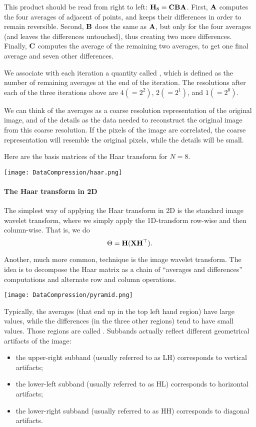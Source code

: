 \documentclass[a4paper, 11pt, openany]{book}
\begin{document}
This product should be read from right to left: ${\bf H}_8 = {\bf C}{\bf B}{\bf A}$. First, ${\bf A}$ computes the four averages of adjacent of points, and keeps their differences in order to remain reversible. Second, ${\bf B}$ does the same as ${\bf A}$, but only for the four averages (and leaves the differences untouched), thus creating two more differences. Finally, ${\bf C}$ computes the average of the remaining two averages, to get one final average and seven other differences.

We associate with each iteration a quantity called , which is defined as the number of remaining averages at the end of the iteration. The resolutions after each of the three iterations above are $4(= 2^2)$, $2(= 2^1)$, and $1(= 2^0)$.

We can think of the averages as a coarse resolution representation of
the original image, and of the details as the data needed to reconstruct the original image from this coarse resolution. If the pixels of the image are correlated, the coarse representation will resemble the original pixels, while the details will be small.

Here are the basis matrices of the Haar transform for $N = 8$.

\begin{center}
\texttt{[image: DataCompression/haar.png]}
\end{center}

\paragraph{The Haar transform in 2D}
The simplest way of applying the Haar transform in 2D is the standard image wavelet transform, where we simply apply the 1D-transform row-wise and then column-wise. That is, we do
\[
    \Theta = {\bf H} ({\bf X}{\bf H}^\top).
\]

Another, much more common, technique is the  image wavelet transform. The idea is to decompose the Haar matrix as a chain of ``averages and differences'' computations and alternate row and column operations.

\begin{center}
\texttt{[image: DataCompression/pyramid.png]}
\end{center}


Typically, the averages (that end up in the top left hand region) have large values, while the differences (in the three other regions) tend to have small values. Those regions are called . Subbands actually reflect different geometrical artifacts of the image:
\begin{itemize}
    \item  the upper-right subband (usually referred to as LH) corresponds to vertical artifacts;

    \item the lower-left subband (usually referred to as HL) corresponds to horizontal artifacts;

    \item the lower-right subband (usually referred to as HH) corresponds to diagonal artifacts.
\end{itemize}
\end{document}
